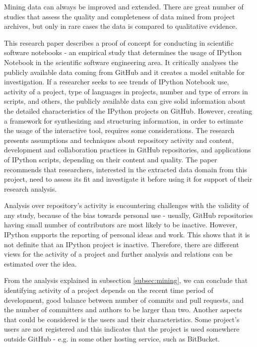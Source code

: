 Mining data can always be improved and extended. There are great number of studies that assess the quality and completeness of data mined from project archives, but only in rare cases the data is compared to qualitative evidence\cite{aranda2009secret}\cite{kalliamvakoupromises}. 

This research paper describes a proof of concept for conducting in scientific software notebooks - an empirical study that determines the usage of IPython Notebook in the scientific software engineering area. It critically analyses the publicly available data coming from GitHub\cite{gitHubWiki} and it creates a model suitable for investigation. If a researcher seeks to see trends of IPython Notebook use, activity of a project, type of languages in projects, number and type of errors in scripts, and others,
the publicly available data can give solid information about the detailed
characteristics of the IPython projects on GitHub. However, creating a framework for synthesizing and structuring information, in order to estimate the usage of the interactive tool, requires some considerations. The research presents assumptions and techniques about repository activity and content, development and collaboration practices in GitHub repositories, and applications of IPython scripts, depending on their content and quality. The paper recommends that researchers, interested in the extracted data domain from this project, need to assess its fit and investigate it before using it for support of their research analysis.

Analysis over repository's activity is encountering challenges with the validity of any study, because of the bias towards personal use - usually, GitHub repositories having small number of contributors are most likely to be inactive. However, IPython supports the reporting of personal ideas and work. This shows that it is not definite that an IPython project is inactive. Therefore, there are different views for the activity of a project and further analysis and relations can be estimated over the idea.

From the analysis explained in subsection \ref{subsec:mining}, we can conclude that identifying activity of a project depends on the recent time period of development, good balance between number of commits and pull requests, and the number of committers and authors to be larger than two. Another aspects that could be considered is the users and their characteristics. Some project's users are not registered and this indicates that the project is used somewhere outside GitHub - e.g. in some other hosting service, such as BitBucket\cite{bitBucket}.

